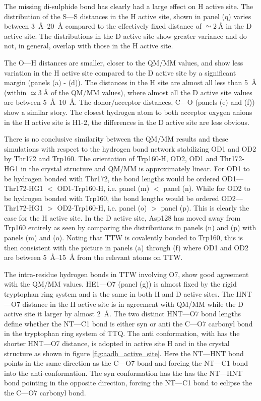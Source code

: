 The missing di-sulphide bond has clearly had a large effect on H active site. The distribution of the S---S distances in the H active site, shown in panel (q) varies between  \SIrange{3}{20}{\angstrom} compared to the effectively fixed distance of $\simeq \SI{2}{\angstrom}$ in the D active site. The distributions in the D active site show greater variance and do not, in general, overlap with those in the H active site. 

The O---H distances are smaller, closer to the QM/MM values, and show less variation in the H active site compared to the D active site by a significant margin (panels (a) - (d)). The distances in the H site are almost all less than \SI{5}{\angstrom} (within $\simeq\SI{3}{\angstrom}$ of the QM/MM values), where almost all the D active site values are between \SIrange{5}{10}{\angstrom}. The donor/acceptor distances, C---O (panels (e) and (f)) show a similar story. The closest hydrogen atom to both acceptor oxygen anions in the H active site is H1-2, the differences in the D active site are less obvious.

There is no conclusive similarity between the QM/MM results and these simulations with respect to the hydrogen bond network stabilizing OD1 and OD2 by Thr172 and Trp160. The orientation of Trp160-H, OD2, OD1 and Thr172-HG1 in the crystal structure and QM/MM is approximately linear. For OD1 to be hydrogen bonded with Thr172, the bond lengths would be ordered OD1---Thr172-HG1 $<$ OD1-Trp160-H, i.e. panel (m) $<$ panel (n). While for OD2 to be hydrogen bonded with Trp160, the bond lengths would be ordered OD2---Thr172-HG1 $>$ OD2-Trp160-H, i.e. panel (o) $>$ panel (p). This is clearly the case for the H active site. In the D active site, Asp128 has moved away from Trp160 entirely as seen by comparing the distributions in  panels (n) and (p)  with panels (m) and (o). Noting that TTW is covalently bonded to Trp160, this is then consistent with the picture in panels (a) through (f) where OD1 and OD2 are between \SIrange{5}{15}{\angstrom} from the relevant atoms on TTW.  

The intra-residue hydrogen bonds in TTW involving O7, show good agreement with the QM/MM values. HE1---O7 (panel (g)) is almost fixed by the rigid tryptophan ring system and is the same in both H and D active sites. The HNT---O7 distance in the H active site is in agreement with QM/MM while the D active site it larger by almost \SI{2}{\angstrom}. The two distinct HNT---O7 bond lengths define whether the NT---C1 bond is either syn or anti the C---O7 carbonyl bond in the tryptophan ring system of TTQ. The anti conformation, with has the shorter HNT---O7 distance, is adopted in active site H and in the crystal structure as shown in figure \ref{fig:aadh_active_site}.  Here the NT---HNT bond points in the same direction as the C---O7 bond and forcing the NT---C1 bond into the anti-conformation. The syn conformation has the has the NT---HNT bond pointing in the opposite direction, forcing the NT---C1 bond to eclipse the the C---O7 carbonyl bond. 

